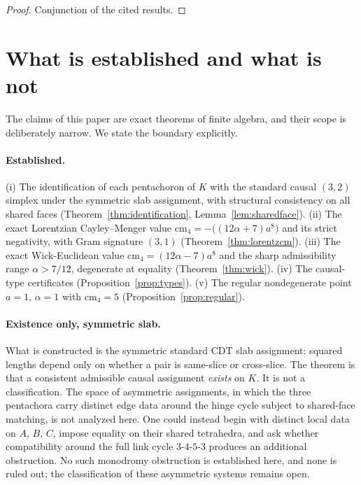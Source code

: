 \documentclass[11pt]{article}
\theoremstyle{definition}
\theoremstyle{remark}
\newcommand{\cm}{\mathrm{cm}_{4}}
\newcommand{\Kmin}{K}
\begin{document}
\begin{proof}
Conjunction of the cited results.
\end{proof}

\section{What is established and what is not}
\label{sec:scope}

The claims of this paper are exact theorems of finite algebra, and their scope is deliberately narrow. We state the boundary explicitly.

\paragraph{Established.}
(i) The identification of each pentachoron of $\Kmin$ with the standard causal $(3,2)$ simplex under the symmetric slab assignment, with structural consistency on all shared faces (Theorem~\ref{thm:identification}, Lemma~\ref{lem:sharedface}). (ii) The exact Lorentzian Cayley--Menger value $\cm=-\bigl((12\alpha+7)a^{8}\bigr)$ and its strict negativity, with Gram signature $(3,1)$ (Theorem~\ref{thm:lorentzcm}). (iii) The exact Wick-Euclidean value $\cm=(12\alpha-7)a^{8}$ and the sharp admissibility range $\alpha>7/12$, degenerate at equality (Theorem~\ref{thm:wick}). (iv) The causal-type certificates (Proposition~\ref{prop:types}). (v) The regular nondegenerate point $a=1$, $\alpha=1$ with $\cm=5$ (Proposition~\ref{prop:regular}).

\paragraph{Existence only, symmetric slab.}
What is constructed is the symmetric standard CDT slab assignment: squared lengths depend only on whether a pair is same-slice or cross-slice. The theorem is that a consistent admissible causal assignment \emph{exists} on $\Kmin$. It is not a classification. The space of asymmetric assignments, in which the three pentachora carry distinct edge data around the hinge cycle subject to shared-face matching, is not analyzed here. One could instead begin with distinct local data on $A$, $B$, $C$, impose equality on their shared tetrahedra, and ask whether compatibility around the full link cycle $3$-$4$-$5$-$3$ produces an additional obstruction. No such monodromy obstruction is established here, and none is ruled out; the classification of these asymmetric systems remains open.
\end{document}

